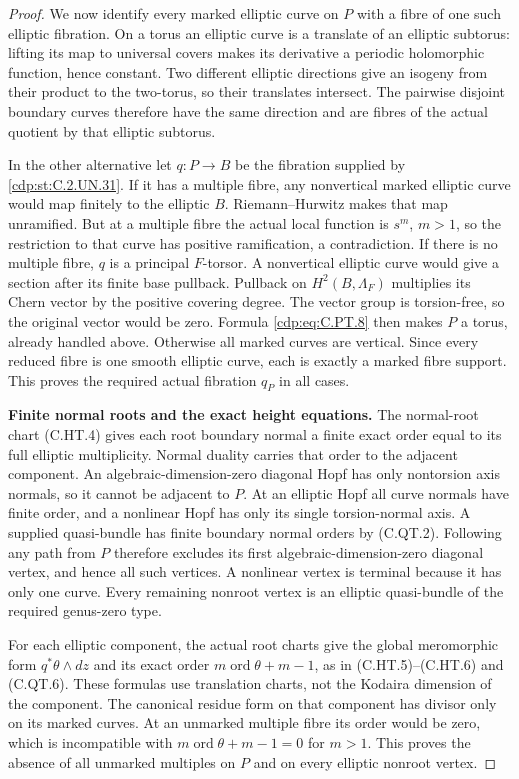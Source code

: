 \begin{proof}
We now identify every marked elliptic curve on $P$
with a fibre of one such elliptic fibration.
On a torus an elliptic curve is a translate of an
elliptic subtorus: lifting its map to universal
covers makes its derivative a periodic holomorphic
function, hence constant. Two different elliptic
directions give an isogeny from their product to
the two-torus, so their translates intersect.
The pairwise disjoint boundary curves therefore
have the same direction and are fibres of the
actual quotient by that elliptic subtorus.

In the other alternative let $q:P\to B$ be the
fibration supplied by \ref{cdp:st:C.2.UN.31}. If it has a multiple
fibre, any nonvertical marked elliptic curve would
map finitely to the elliptic $B$. Riemann--Hurwitz
makes that map unramified. But at a multiple fibre
the actual local function is $s^m$, $m>1$,
so the restriction to that curve has positive
ramification, a contradiction.
If there is no multiple fibre, $q$ is a principal
$F$-torsor. A nonvertical elliptic curve would give
a section after its finite base pullback. Pullback
on $H^2(B,\Lambda_F)$ multiplies its Chern vector
by the positive covering degree. The vector group
is torsion-free, so the original vector would be
zero. Formula \eqref{cdp:eq:C.PT.8} then makes $P$ a torus,
already handled above. Otherwise all marked
curves are vertical. Since every reduced fibre
is one smooth elliptic curve, each is exactly
a marked fibre support. This proves the required
actual fibration $q_P$ in all cases.

\par\medskip\noindent\textbf{Finite normal roots and the exact height equations.}
The normal-root chart (C.HT.4) gives each root
boundary normal a finite exact order equal to its
full elliptic multiplicity. Normal duality carries
that order to the adjacent component.
An algebraic-dimension-zero diagonal Hopf has only
nontorsion axis normals, so it cannot be adjacent
to $P$. At an elliptic Hopf all curve normals have
finite order, and a nonlinear Hopf has only its
single torsion-normal axis. A supplied quasi-bundle
has finite boundary normal orders by (C.QT.2).
Following any path from $P$ therefore excludes
its first algebraic-dimension-zero diagonal
vertex, and hence all such vertices. A nonlinear
vertex is terminal because it has only one curve.
Every remaining nonroot vertex is an elliptic
quasi-bundle of the required genus-zero type.

For each elliptic component, the actual root
charts give the global meromorphic form
$q^*\theta\wedge dz$ and its exact order
$m\operatorname{ord}\theta+m-1$, as in
(C.HT.5)--(C.HT.6) and (C.QT.6). These formulas
use translation charts, not the Kodaira dimension
of the component. The canonical residue form
on that component has divisor only on its
marked curves. At an unmarked multiple fibre
its order would be zero, which is incompatible
with $m\operatorname{ord}\theta+m-1=0$ for
$m>1$. This proves the absence of all unmarked
multiples on $P$ and on every elliptic nonroot
vertex.


\end{proof}
